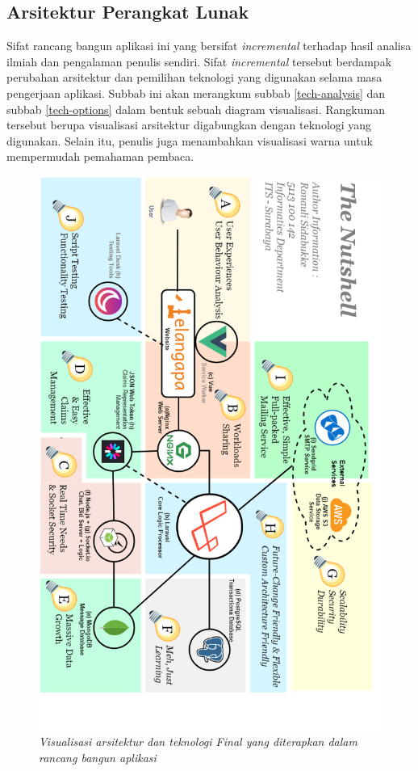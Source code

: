 
\subsection{Arsitektur Perangkat Lunak}
	\label{final-arch-tech}
	Sifat rancang bangun aplikasi ini yang bersifat \textit{incremental} terhadap hasil analisa ilmiah dan pengalaman penulis sendiri. Sifat \textit{incremental} tersebut berdampak perubahan arsitektur dan pemilihan teknologi yang digunakan selama masa pengerjaan aplikasi. Subbab ini akan merangkum subbab \ref{tech-analysis} dan subbab \ref{tech-options} dalam bentuk sebuah diagram visualisasi. Rangkuman tersebut berupa visualisasi arsitektur digabungkan dengan teknologi yang digunakan. Selain itu, penulis juga menambahkan visualisasi warna untuk mempermudah pemahaman pembaca.
	\newpage
	\begin{figure}[H]
		\centering
		\includegraphics[height=.9\textheight]{images/bab3/arsitektur-app-pl_2.png}
		\caption{\textit{Visualisasi arsitektur dan teknologi Final yang diterapkan dalam rancang bangun aplikasi}}
			\label{final-arch-tech-figure}
	\end{figure}
	
	
